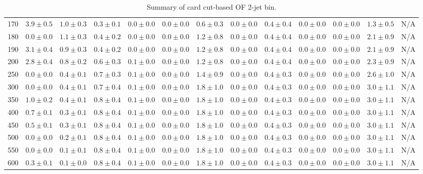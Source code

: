 \begin{table}
{\begin{center}
\begin{tabular}{l | c c | c c c c c c c c  | c c}
170 & $3.9\pm0.5$ & $1.0\pm0.3$ & $0.3\pm0.1$ & $0.0\pm0.0$ & $0.0\pm0.0$ & $0.6\pm0.3$ & $0.0\pm0.0$ & $0.4\pm0.4$ & $0.0\pm0.0$ & $0.0\pm0.0$ & $1.3\pm0.5$ & N/A \\
180 & $0.0\pm0.0$ & $1.1\pm0.3$ & $0.4\pm0.2$ & $0.0\pm0.0$ & $0.0\pm0.0$ & $1.2\pm0.8$ & $0.0\pm0.0$ & $0.4\pm0.4$ & $0.0\pm0.0$ & $0.0\pm0.0$ & $2.1\pm0.9$ & N/A \\
190 & $3.1\pm0.4$ & $0.9\pm0.3$ & $0.4\pm0.2$ & $0.0\pm0.0$ & $0.0\pm0.0$ & $1.2\pm0.8$ & $0.0\pm0.0$ & $0.4\pm0.4$ & $0.0\pm0.0$ & $0.0\pm0.0$ & $2.1\pm0.9$ & N/A \\
200 & $2.8\pm0.4$ & $0.8\pm0.2$ & $0.6\pm0.3$ & $0.1\pm0.0$ & $0.0\pm0.0$ & $1.2\pm0.8$ & $0.0\pm0.0$ & $0.4\pm0.4$ & $0.0\pm0.0$ & $0.0\pm0.0$ & $2.3\pm0.9$ & N/A \\
250 & $0.0\pm0.0$ & $0.4\pm0.1$ & $0.7\pm0.3$ & $0.1\pm0.0$ & $0.0\pm0.0$ & $1.4\pm0.9$ & $0.0\pm0.0$ & $0.4\pm0.3$ & $0.0\pm0.0$ & $0.0\pm0.0$ & $2.6\pm1.0$ & N/A \\
300 & $0.0\pm0.0$ & $0.4\pm0.1$ & $0.7\pm0.4$ & $0.1\pm0.0$ & $0.0\pm0.0$ & $1.8\pm1.0$ & $0.0\pm0.0$ & $0.4\pm0.3$ & $0.0\pm0.0$ & $0.0\pm0.0$ & $3.0\pm1.1$ & N/A \\
350 & $1.0\pm0.2$ & $0.4\pm0.1$ & $0.8\pm0.4$ & $0.1\pm0.0$ & $0.0\pm0.0$ & $1.8\pm1.0$ & $0.0\pm0.0$ & $0.4\pm0.3$ & $0.0\pm0.0$ & $0.0\pm0.0$ & $3.0\pm1.1$ & N/A \\
400 & $0.7\pm0.1$ & $0.3\pm0.1$ & $0.8\pm0.4$ & $0.1\pm0.0$ & $0.0\pm0.0$ & $1.8\pm1.0$ & $0.0\pm0.0$ & $0.4\pm0.3$ & $0.0\pm0.0$ & $0.0\pm0.0$ & $3.0\pm1.1$ & N/A \\
450 & $0.5\pm0.1$ & $0.3\pm0.1$ & $0.8\pm0.4$ & $0.1\pm0.0$ & $0.0\pm0.0$ & $1.8\pm1.0$ & $0.0\pm0.0$ & $0.4\pm0.3$ & $0.0\pm0.0$ & $0.0\pm0.0$ & $3.0\pm1.1$ & N/A \\
500 & $0.0\pm0.0$ & $0.2\pm0.1$ & $0.8\pm0.4$ & $0.1\pm0.0$ & $0.0\pm0.0$ & $1.8\pm1.0$ & $0.0\pm0.0$ & $0.4\pm0.3$ & $0.0\pm0.0$ & $0.0\pm0.0$ & $3.0\pm1.1$ & N/A \\
550 & $0.0\pm0.0$ & $0.1\pm0.1$ & $0.8\pm0.4$ & $0.1\pm0.0$ & $0.0\pm0.0$ & $1.8\pm1.0$ & $0.0\pm0.0$ & $0.4\pm0.3$ & $0.0\pm0.0$ & $0.0\pm0.0$ & $3.0\pm1.1$ & N/A \\
600 & $0.3\pm0.1$ & $0.1\pm0.0$ & $0.8\pm0.4$ & $0.1\pm0.0$ & $0.0\pm0.0$ & $1.8\pm1.0$ & $0.0\pm0.0$ & $0.4\pm0.3$ & $0.0\pm0.0$ & $0.0\pm0.0$ & $3.0\pm1.1$ & N/A \\
\hline
\end{tabular}
\end{center}
}
\caption{Summary of card cut-based OF 2-jet bin.}
\end{table}
